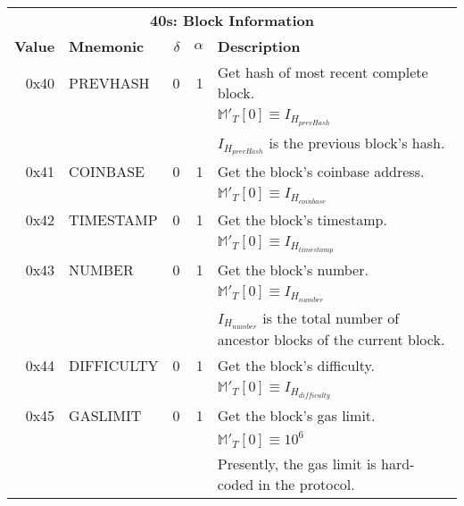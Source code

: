 \documentclass[9pt,oneside]{amsart}
\begin{document}
\begin{tabular*}{\columnwidth}[h]{rlrrl}
\toprule
\multicolumn{5}{c}{\textbf{40s: Block Information}} \vspace{5pt} \\
\textbf{Value} & \textbf{Mnemonic} & $\delta$ & $\alpha$ & \textbf{Description} \vspace{5pt} \\
0x40 & {\small PREVHASH} & 0 & 1 & Get hash of most recent complete block. \\
&&&& $\mathbb{M}'_T[0] \equiv I_{H_{prevHash}}$ \\
&&&& $I_{H_{prevHash}}$ is the previous block's hash. \\
\midrule
0x41 & {\small COINBASE} & 0 & 1 & Get the block's coinbase address. \\
&&&& $\mathbb{M}'_T[0] \equiv I_{H_{coinbase}}$ \\
\midrule
0x42 & {\small TIMESTAMP} & 0 & 1 & Get the block's timestamp. \\
&&&& $\mathbb{M}'_T[0] \equiv I_{H_{timestamp}}$ \\
\midrule
0x43 & {\small NUMBER} & 0 & 1 & Get the block's number. \\
&&&& $\mathbb{M}'_T[0] \equiv I_{H_{number}}$ \\
&&&& $I_{H_{number}}$ is the total number of ancestor blocks of the current block. \\
\midrule
0x44 & {\small DIFFICULTY} & 0 & 1 & Get the block's difficulty. \\
&&&& $\mathbb{M}'_T[0] \equiv I_{H_{difficulty}}$ \\
\midrule
0x45 & {\small GASLIMIT} & 0 & 1 & Get the block's gas limit. \\
&&&& $\mathbb{M}'_T[0] \equiv 10^6$ \\
&&&& Presently, the gas limit is hard-coded in the protocol. \\
\bottomrule
\end{tabular*}
\end{document}
